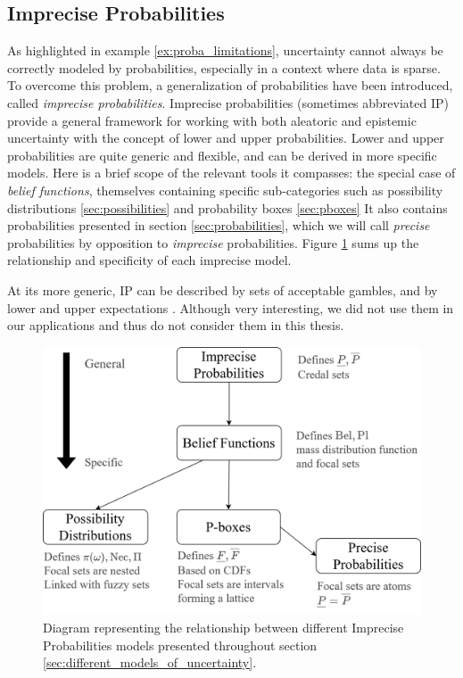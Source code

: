 \subsection{Imprecise Probabilities}\label{sec:imprecise_probabilities}
As highlighted in example \ref{ex:proba_limitations}, uncertainty cannot always be correctly modeled by probabilities, especially in a context where data is sparse. To overcome this problem, a generalization of probabilities have been introduced, called \textit{imprecise probabilities}. Imprecise probabilities (sometimes abbreviated IP) provide a general framework for working with both aleatoric and epistemic uncertainty with the concept of lower and upper probabilities. Lower and upper probabilities are quite  generic and flexible, and can be derived in more specific models. Here is a brief scope of the relevant tools it compasses: the special case of \textit{belief functions}, themselves containing specific sub-categories such as possibility distributions \ref{sec:possibilities} and probability boxes \ref{sec:pboxes} \etc{} It also contains probabilities presented in section \ref{sec:probabilities}, which we will call \textit{precise} probabilities by opposition to \textit{imprecise} probabilities. Figure \ref{fig:diagram_IP} sums up the relationship and specificity of each imprecise model.

\begin{remark}
    At its more generic, IP can be described by sets of acceptable gambles, and by lower and upper expectations \cite{walley_statistical_1991,augustin_introduction_2014}. Although very interesting, we did not use them in our applications and thus do not consider them in this thesis.
\end{remark}
\begin{figure}[ht]
    {\centering
    \includegraphics[width=0.8\linewidth]{Images/Chap_2/Diagramme_IP_Bel.png}
    \caption{Diagram representing the relationship between different Imprecise Probabilities models presented throughout section \ref{sec:different_models_of_uncertainty}.}
    \label{fig:diagram_IP}}
\end{figure}

